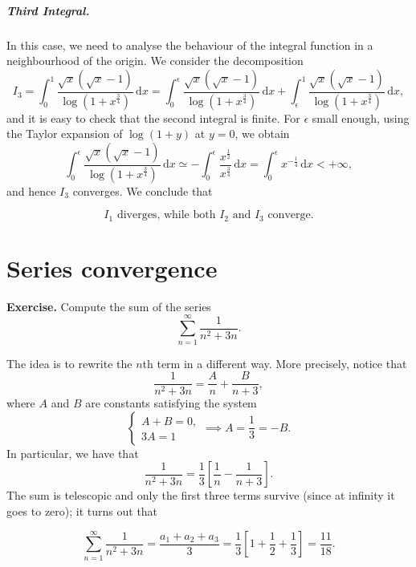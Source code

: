 \documentclass[a4paper,10 pt]{report}
\newcommand{\finalanswer}[1]{%
    \begin{finalAnswer}
    \[
        #1
    \]
    \end{finalAnswer}
}
\theoremstyle{definition}
\begin{document}
\begin{solutionBox}
\paragraph{Third Integral.} In this case, we need to analyse the behaviour of the integral function in a neighbourhood of the origin. We consider the decomposition
\begin{equation*}I_3 = \int_0^{1} \frac{ \sqrt{x}(\sqrt{x} - 1)}{\log(1 + x^{\frac{3}{4}}) } \, \mathrm{d}x = \int_0^\epsilon \frac{ \sqrt{x}(\sqrt{x} - 1)}{\log(1 + x^{\frac{3}{4}}) } \, \mathrm{d}x + \int_\epsilon^1 \frac{ \sqrt{x}(\sqrt{x} - 1)}{\log(1 + x^{\frac{3}{4}}) } \, \mathrm{d}x, \end{equation*} 
and it is easy to check that the second integral is finite. For $\epsilon$ small enough, using the Taylor expansion of $\log(1 + y)$ at $y = 0$, we obtain
\begin{equation*} \int_0^\epsilon \frac{ \sqrt{x}(\sqrt{x} - 1)}{\log(1 + x^{\frac{3}{4}}) } \, \mathrm{d}x \simeq - \int_0^\epsilon \frac{x^{\frac{1}{2}}}{x^{\frac{3}{4}}} \, \mathrm{d}x = \int_0^\epsilon x^{- \frac{1}{4}} \, \mathrm{d}x < + \infty, \end{equation*} 
and hence $I_3$ converges. We conclude that
\finalanswer{
\text{$I_1$ diverges, while both $I_2$ and $I_3$ converge}.
}\end{solutionBox}


\chapter{Series convergence}

\begin{exerciseBox} \textbf{Exercise.} Compute the sum of the series
\begin{equation*}\sum_{n = 1}^\infty \frac{1}{n^2 + 3n}.\end{equation*} \end{exerciseBox}

\begin{solutionBox} The idea is to rewrite the $n$th term in a different way. More precisely, notice that
\begin{equation*} \frac{1}{n^2 + 3n} = \frac{A}{n} + \frac{B}{n + 3},\end{equation*}
where $A$ and $B$ are constants satisfying the system
\begin{equation*} \begin{cases} A + B = 0, \\[0.6em] 3A = 1 \end{cases} \implies A = \frac{1}{3} = - B.\end{equation*}
In particular, we have that
\begin{equation*} \frac{1}{n^2 + 3n} = \frac{1}{3} \left[ \frac{1}{n} - \frac{1}{n + 3} \right].\end{equation*}
The sum is telescopic and only the first three terms survive (since at infinity it goes to zero); it turns out that
\finalanswer{
\sum_{n = 1}^\infty \frac{1}{n^2 + 3n} =\frac{a_1 + a_2 + a_3}{3} = \frac{1}{3} \left[ 1 + \frac{1}{2} + \frac{1}{3} \right] = \frac{11}{18}. 
}\end{solutionBox}
\end{document}

